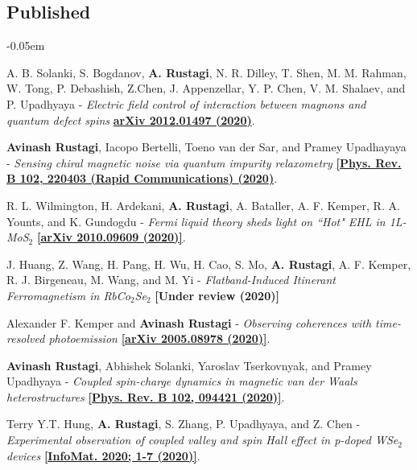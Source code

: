 \documentclass[12pt]{article}
\begin{document}
\subsection*{Published}
\begin{etaremune}
\itemsep-0.05em
\item A. B. Solanki, S. Bogdanov, {\bf A. Rustagi}, N. R. Dilley, T. Shen, M. M. Rahman, W. Tong, P. Debashish, Z.Chen, J. Appenzellar, Y. P. Chen, V. M. Shalaev, and P. Upadhyaya - \textit{Electric field control of interaction between magnons and quantum defect spins} \href{https://arxiv.org/abs/2012.01497}{\bf arXiv 2012.01497 (2020)}.

\item {\bf Avinash Rustagi}, Iacopo Bertelli, Toeno van der Sar, and Pramey Upadhayaya - \textit{Sensing chiral magnetic noise via quantum impurity relaxometry} \href{https://link.aps.org/doi/10.1103/PhysRevB.102.220403}{\bf [Phys. Rev. B 102, 220403 (Rapid Communications) (2020)}.

\item R. L. Wilmington, H. Ardekani, {\bf A. Rustagi}, A. Bataller, A. F. Kemper, R. A. Younts, and K. Gundogdu - \textit{Fermi liquid theory sheds light on ``Hot" EHL in 1L-MoS$_2$} \href{https://arxiv.org/abs/2010.09609}{\bf [arXiv 2010.09609 (2020)]}.

\item J. Huang, Z. Wang, H. Pang, H. Wu, H. Cao, S. Mo, {\bf A. Rustagi}, A. F. Kemper, R. J. Birgeneau, M. Wang, and M. Yi - \textit{Flatband-Induced Itinerant Ferromagnetism in RbCo$_2$Se$_2$} {\bf [Under review (2020)]}

\item Alexander F. Kemper and {\bf Avinash Rustagi} - \textit{Observing coherences with time-resolved photoemission} \href{https://arxiv.org/abs/2005.08978}{\bf [arXiv 2005.08978 (2020)]}.

\item {\bf Avinash Rustagi}, Abhishek Solanki, Yaroslav Tserkovnyak, and Pramey Upadhyaya - \textit{Coupled spin-charge dynamics in magnetic van der Waals heterostructures} \href{https://link.aps.org/doi/10.1103/PhysRevB.102.094421}{\bf [Phys. Rev. B 102, 094421 (2020)]}.

\item Terry Y.T. Hung, {\bf A. Rustagi}, S. Zhang, P. Upadhyaya, and Z. Chen - \textit{Experimental observation of coupled valley and spin Hall effect in p-doped WSe$_2$ devices} \href{http://dx.doi.org/10.1002/inf2.12095} {\bf[InfoMat. 2020; 1-7 (2020)]}.


\end{etaremune}
\end{document}
